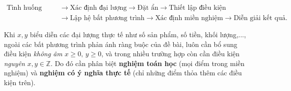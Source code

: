 \documentclass[12pt,a4paper]{report}
\begin{document}
\[
\begin{aligned}
\text{Tình huống thực tế}
&\rightarrow \text{Xác định đại lượng}
\rightarrow \text{Đặt ẩn}
\rightarrow \text{Thiết lập điều kiện} \\
&\rightarrow \text{Lập hệ bất phương trình}
\rightarrow \text{Xác định miền nghiệm}
\rightarrow \text{Diễn giải kết quả}.
\end{aligned}
\]

\begin{warningbox}
Khi $x,y$ biểu diễn các đại lượng thực tế như số sản phẩm, số tiền, khối lượng,..., ngoài các bất phương trình phản ánh ràng buộc của đề bài, luôn cần bổ sung điều kiện \emph{không âm} $x\ge 0,\,y\ge 0$, và trong nhiều trường hợp còn cần điều kiện \emph{nguyên} $x,y\in\mathbb{Z}$. Do đó cần phân biệt \textbf{nghiệm toán học} (mọi điểm trong miền nghiệm) và \textbf{nghiệm có ý nghĩa thực tế} (chỉ những điểm thỏa thêm các điều kiện trên).
\end{warningbox}
\end{document}
